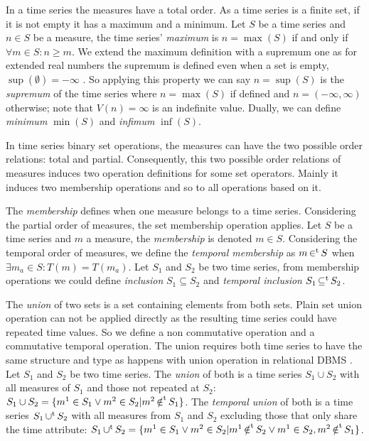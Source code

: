 In a time series the measures have a total order.  As a time series is
a finite set, if it is not empty it has a maximum and a minimum.  Let
$S$ be a time series and $n\in S$ be a measure, the time series'
\emph{maximum} is $n=\max(S)$ if and only if $\forall m \in S: n \geq
m $.  We extend the maximum definition with a supremum one as for
extended real numbers the supremum is defined even when a set is
empty, $\sup(\emptyset)=-\infty$ \cite{cantrell:extendedreal}. So
applying this property we can say $n=\sup(S)$ is the \emph{supremum}
of the time series where $n=\max(S)$ if defined and
$n=(-\infty,\infty)$ otherwise; note that $V(n)=\infty$ is an
indefinite value.  Dually, we can define \emph{minimum} $\min(S)$ and
\emph{infimum} $\inf(S)$.


In time series binary set operations, the measures can have the
two possible order relations: total and partial. Consequently, this two
possible order relations of measures induces two operation definitions
for some set operators.  Mainly it induces two membership operations
and so to all operations based on it. 


The \emph{membership} defines when one measure belongs to a time
series. Considering the partial order of measures, the set
membership operation applies. Let $S$ be a time series and $m$ a
measure, the \emph{membership} is denoted $m \in S$. Considering the
temporal order of measures, we define the \emph{temporal membership}
as $m \operatorname*{\in^t} S$ when $\exists m_a \in S : T(m) = T(m_a)$.  Let $S_1$
and $S_2$ be two time series, from membership operations we could
define \emph{inclusion} $S_1\subseteq S_2$ and \emph{temporal
  inclusion} $S_1\operatorname*{\subseteq^t} S_2$.


The \emph{union} of two sets is a set containing elements from both
sets. Plain set union operation can not be applied directly as the
resulting time series could have repeated time values.  So we define a
non commutative operation and a commutative temporal operation. The
union requires both time series to have the same structure and type as
happens with union operation in relational DBMS
\cite{date:introduction}. %
Let $S_1$ and $S_2$ be two time series. The \emph{union} of both is a
time series $S_1 \cup S_2$ with all measures of $S_1$ and those not
repeated at $S_2$: $S_1 \cup S_2 = \{m^1 \in S_1 \vee m^2 \in S_2 |
m^2 \operatorname*{\notin^t} S_1 \}$. The \emph{temporal union} of both is a time
series $S_1 \operatorname*{\cup^t} S_2$ with all measures from $S_1$ and $S_2$
excluding those that only share the time attribute: $S_1 \operatorname*{\cup^t} S_2 =
\{ m^1 \in S_1 \vee m^2 \in S_2 | m^1 \operatorname*{\notin^t} S_2 \vee m^1 \in S_2,
m^2 \operatorname*{\notin^t} S_1 \}$.


